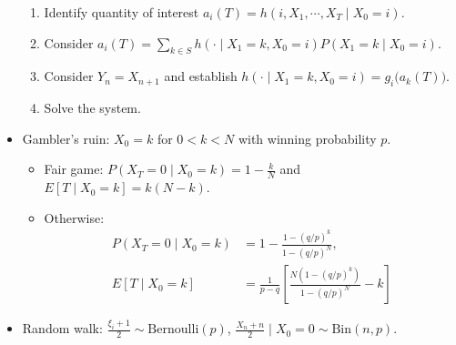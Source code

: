 \documentclass[10pt]{article}
\begin{document}
\begin{multicols*}{2}
\begin{itemize}
\begin{enumerate}
                \item Identify quantity of interest $a_i\left(T\right) = h\left(i, X_1, \cdots, X_T \mid X_0 = i\right)$.
                \item Consider $a_i\left(T\right) = \sum_{k \in S}h\left(\cdot \mid X_1 = k, X_0 = i\right)P\left(X_1 = k \mid X_0 = i\right)$.
                \item Consider $Y_n = X_{n + 1}$ and establish $h\left(\cdot \mid X_1 = k, X_0 = i\right) = g_i\bigl(a_k\left(T\right)\bigr)$.
                \item Solve the system.
            \end{enumerate}
            \item Gambler's ruin: $X_0 = k$ for $0 < k < N$ with winning probability $p$.
            \begin{itemize}
                \item Fair game: $P\left(X_T = 0 \mid X_0 = k\right) = 1 - \frac{k}{N}$ and $E\left[T \mid X_0 = k\right] = k\left(N - k\right)$.
                \item Otherwise: 
                \begin{align*}
                    P\left(X_T = 0 \mid X_0 = k\right) & = 1 - \frac{1 - \left(q / p\right)^k}{1 - \left(q / p\right)^N}, \\
                    E\left[T \mid X_0 = k\right] & = \frac{1}{p - q}\left[\frac{N\left(1 - \left(q / p\right)^k\right)}{1 - \left(q / p\right)^N} - k\right]
                \end{align*}
            \end{itemize}
            \item Random walk: $\frac{\xi_i + 1}{2} \sim \mathrm{Bernoulli}\left(p\right)$, $\frac{X_n + n}{2} \mid X_0 = 0 \sim \mathrm{Bin}\left(n, p\right)$.
        \end{itemize}
    \end{multicols*}
\end{document}
